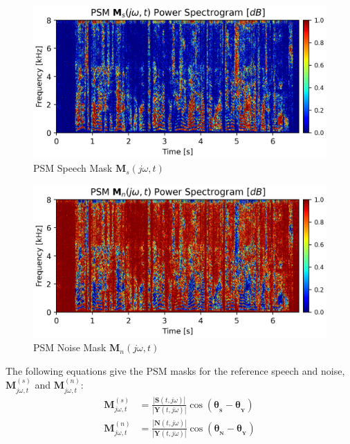 \begin{figure}[H]
    \centering
    \includegraphics[width=\linewidth]{Features/images/psm_mask}
    \caption{PSM Speech Mask \(\mathbf{M}_{s}(j\omega, t)\)}\label{fig:psm_mask}
\end{figure}
\vspace{-0.5cm}
\begin{figure}[H]
    \centering
    \includegraphics[width=\linewidth]{Features/images/psm_mask_noise}
    \caption{PSM Noise Mask \(\mathbf{M}_{n}(j\omega, t)\)}\label{fig:psm_mask_noise}
\end{figure}
The following equations give the PSM masks for the reference speech and noise,
\(\mathbf{M}^{(s)}_{j\omega, t}\) and \(\mathbf{M}^{(n)}_{j\omega, t}\):
\begin{align}
    \mathbf{M}^{(s)}_{j\omega, t} & = \frac{|\mathbf{S}(t,j\omega)|}{|\mathbf{Y}(t,j\omega)|} \cos(\bm{\theta}_{_{\mathbf{S}}} - \bm{\theta}_{_{\mathbf{Y}}}) \\
    \mathbf{M}^{(n)}_{j\omega, t} & = \frac{|\mathbf{N}(t,j\omega)|}{|\mathbf{Y}(t,j\omega)|} \cos(\bm{\theta}_{_{\mathbf{N}}} - \bm{\theta}_{_{\mathbf{Y}}})
\end{align}

